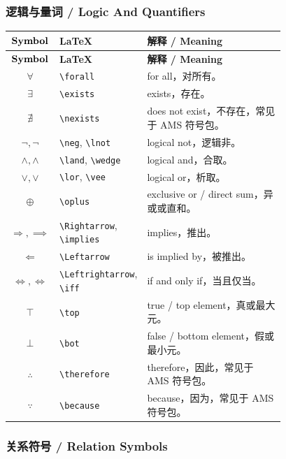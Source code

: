 \documentclass[11pt]{article}
\begin{document}
\subsubsection{逻辑与量词 / Logic And Quantifiers}

\begin{longtable}{>{$}c<{$} p{0.26\linewidth} p{0.52\linewidth}}
\hline
\text{\textbf{Symbol}} & \textbf{LaTeX} & \textbf{解释 / Meaning} \\
\hline
\endfirsthead
\hline
\text{\textbf{Symbol}} & \textbf{LaTeX} & \textbf{解释 / Meaning} \\
\hline
\endhead
\forall & \verb|\forall| & for all，对所有。 \\
\exists & \verb|\exists| & exists，存在。 \\
∄ & \verb|\nexists| & does not exist，不存在，常见于 AMS 符号包。 \\
\neg, \lnot & \verb|\neg|, \verb|\lnot| & logical not，逻辑非。 \\
\land, \wedge & \verb|\land|, \verb|\wedge| & logical and，合取。 \\
\lor, \vee & \verb|\lor|, \verb|\vee| & logical or，析取。 \\
\oplus & \verb|\oplus| & exclusive or / direct sum，异或或直和。 \\
\Rightarrow, \implies & \verb|\Rightarrow|, \verb|\implies| & implies，推出。 \\
\Leftarrow & \verb|\Leftarrow| & is implied by，被推出。 \\
\Leftrightarrow, \iff & \verb|\Leftrightarrow|, \verb|\iff| & if and only if，当且仅当。 \\
\top & \verb|\top| & true / top element，真或最大元。 \\
\bot & \verb|\bot| & false / bottom element，假或最小元。 \\
∴ & \verb|\therefore| & therefore，因此，常见于 AMS 符号包。 \\
∵ & \verb|\because| & because，因为，常见于 AMS 符号包。 \\
\hline
\end{longtable}

\subsubsection{关系符号 / Relation Symbols}
\end{document}
